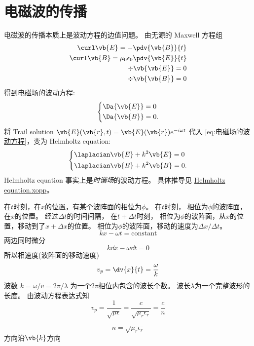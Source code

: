 
\section{电磁波的传播}
电磁波的传播本质上是波动方程的边值问题。
由无源的 Maxwell 方程组
\begin{subequations}
\begin{align}
  \curl \vb{E} = - \pdv{\vb{B}}{t} \\
  \curl \vb{B} =  \mu_0 \epsilon_0 \pdv{\vb{E}}{t} \\
  \div \vb{\vb{E}} =0 \\
  \div \vb{\vb{B}} =0 
\end{align}
\end{subequations}
得到电磁场的波动方程:
\begin{equation}
  \left\{
  \begin{aligned}
  &\Da{\vb{E}} =0 \\
  &\Da{\vb{B}} =0.
  \end{aligned}\right.
  \label{eq:电磁场的波动方程}
\end{equation}
将 Trail solution \(\vb{E}(\vb{r}, t) = \vb{E}(\vb{r}) e^{-i\omega t}\) 代入
\cref{eq:电磁场的波动方程}，变为 Helmholtz equation:
\begin{equation}
  \left\{
  \begin{aligned}
  &\laplacian \vb{E} + k^2 \vb{E} =0 \\
  &\laplacian \vb{B} + k^2 \vb{B} =0.
  \end{aligned}\right.
  \label{eq:Helmholtz_equation}
\end{equation}
Helmholtz equation 事实上是\emph{时谐场}的波动方程。
具体推导见 \href{../drafts/Helmholtz_equation.xopp}{Helmholtz equation.xopp}。

在\(t\)时刻，在\(x\)的位置，有某个波阵面的相位为\(\phi\)。
在\(t\)时刻，
相位为\(\phi\)的波阵面，在\(x\)的位置。
经过\(\Delta t\)的时间间隔，
在\(t+\Delta t\)时刻，
相位为\(\phi\)的波阵面，从\(x\)的位置，移动到了\(x+\Delta x\)的位置。
相位为\(\phi\)的波阵面，移动的速度为\(\Delta x /  \Delta t\)。
\begin{equation}
  k x - \omega t = \text{constant}
\end{equation}
两边同时微分
\begin{equation}
  k \dd{x} - \omega \dd{t} = 0
\end{equation}
所以相速度(波阵面的移动速度)
\begin{equation}
v_p = \dv{x}{t} = \frac{\omega}{k}
\end{equation}
波数 \(k=\omega / v = 2 \pi / \lambda\) 为一个\(2 \pi\)相位内包含的波长个数。
波长\(\lambda\)为一个完整波形的长度。
由波动方程表达式知
\begin{equation}
v_p=
\frac{1}{\sqrt{\mu \epsilon}}
=
\frac{c}{\sqrt{\mu_r \epsilon_r}}
=\frac{c}{n}
\end{equation}
\begin{definition}[折射率]
\begin{equation}
  n = \sqrt{\mu_r \epsilon_r} 
\end{equation}
方向沿\(\vb{k}\)方向
\end{definition}

